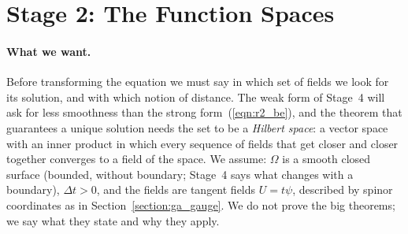 \section{Stage 2: The Function Spaces}
\label{section:r2_stage2}

\paragraph{What we want.} Before transforming the equation we must say in which set of fields we look for its solution, and with which notion of distance. The weak form of Stage~4 will ask for less smoothness than the strong form~(\ref{eqn:r2_be}), and the theorem that guarantees a unique solution needs the set to be a \emph{Hilbert space}: a vector space with an inner product in which every sequence of fields that get closer and closer together converges to a field of the space. We assume: $\Omega$ is a smooth closed surface (bounded, without boundary; Stage~4 says what changes with a boundary), $\Delta t > 0$, and the fields are tangent fields $U = t\psi$, described by spinor coordinates as in Section~\ref{section:ga_gauge}. We do not prove the big theorems; we say what they state and why they apply.

